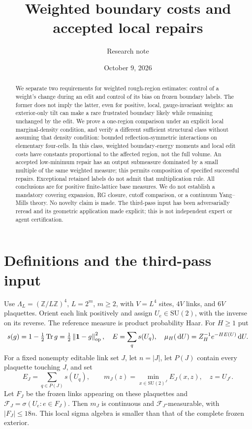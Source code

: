 \documentclass[11pt]{article}
\title{Weighted boundary costs and accepted local repairs}
\author{Research note}
\date{October 9, 2026}
\theoremstyle{definition}
\theoremstyle{remark}
\newcommand{\one}{\mathbf 1}
\newcommand{\dd}{\,\mathrm d}
\newcommand{\Tr}{\operatorname{Tr}}
\newcommand{\SU}{\mathrm{SU}(2)}
\newcommand{\norm}[1]{\left\lVert#1\right\rVert}
\begin{document}
\maketitle
\begin{abstract}
We separate two requirements for weighted rough-region estimates:
control of a weight's change during an edit and control of its bias on
frozen boundary labels. The former does not imply the latter, even for
positive, local, gauge-invariant weights: an exterior-only tilt can make
a rare frustrated boundary likely while remaining unchanged by the edit.
We prove a one-region comparison under an explicit local marginal-density
condition, and verify a different sufficient structural class without
assuming that density condition: bounded reflection-symmetric interactions
on elementary four-cells. In this class, weighted boundary-energy moments
and local edit costs have constants proportional to the affected region,
not the full volume. An accepted low-minimum repair has an output
submeasure dominated by a small multiple of the same weighted measure;
this permits composition of specified successful repairs. Exceptional
retained labels do not admit that multiplication rule. All conclusions
are for positive finite-lattice base measures. We do not establish a
mandatory covering expansion, RG closure, cutoff comparison, or a
continuum Yang--Mills theory. No novelty claim is made. The third-pass
input has been adversarially reread and its geometric application made
explicit; this is not independent expert or agent certification.
\end{abstract}
\tableofcontents

\section{Definitions and the third-pass input}
Use $\Lambda_L=(\mathbb Z/L\mathbb Z)^4$, $L=2^m$, $m\ge2$, with
$V=L^4$ sites, $4V$ links, and $6V$ plaquettes. Orient each link positively
and assign $U_e\in\SU$, with the inverse on its reverse. The reference
measure is product probability Haar. For $H\ge1$ put
\[
 s(g)=1-\tfrac12\Tr g=\tfrac12\norm{\one-g}_{\rm op}^2,\quad
 E=\sum_qs(U_q),\quad
 \mu_H(\dd U)=Z_H^{-1}e^{-HE(U)}\dd U.
\]
For a fixed nonempty editable link set $J$, let $n=|J|$, let $P(J)$
contain every plaquette touching $J$, and set
\[
 E_J=\sum_{q\in P(J)}s(U_q),\qquad
 m_J(z)=\min_{x\in\SU^J}E_J(x,z),\quad z=U_{J^c}.
\]
Let $F_J$ be the frozen links appearing on these plaquettes and
$\mathcal F_J=\sigma(U_e:e\in F_J)$. Then $m_J$ is continuous and
$\mathcal F_J$-measurable, with $|F_J|\le18n$. This local sigma algebra
is smaller than that of the complete frozen exterior.
\end{document}
